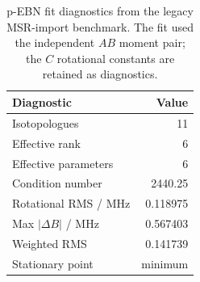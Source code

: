 \begin{table}
\caption{p-EBN fit diagnostics from the legacy MSR-import benchmark. The fit used the independent $AB$ moment pair; the $C$ rotational constants are retained as diagnostics.}
\label{tab:si-p-ebn-fit-diagnostics}
\centering
\begin{tabular}{lr}
\toprule
Diagnostic & Value \\
\midrule
Isotopologues & 11 \\
Effective rank & 6 \\
Effective parameters & 6 \\
Condition number & 2440.25 \\
Rotational RMS / MHz & 0.118975 \\
Max $|\Delta B|$ / MHz & 0.567403 \\
Weighted RMS & 0.141739 \\
Stationary point & minimum \\
\bottomrule
\end{tabular}
\end{table}
